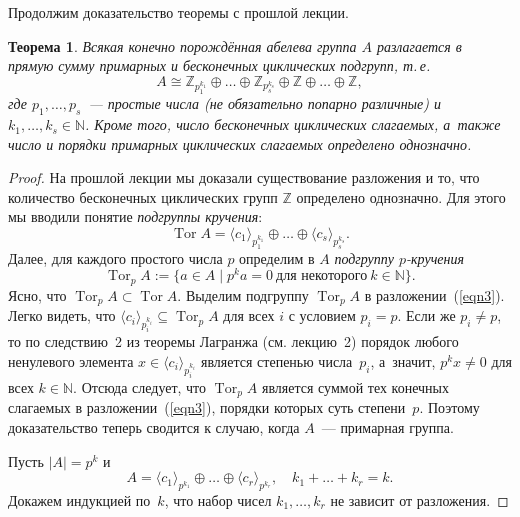 \documentclass[a4paper,10pt]{amsart}
\DeclareMathOperator{\Tor}{\mathrm{Tor}}
\def\ZZ{{\mathbb Z}}%
\def\NN{{\mathbb N}}%
\newtheorem{theorem}{Теорема}
\theoremstyle{definition}
\theoremstyle{remark}
\begin{document}
Продолжим доказательство теоремы с прошлой лекции.

\begin{theorem} \label{traz}
Всякая конечно порождённая абелева группа $A$ разлагается в прямую
сумму примарных и бесконечных циклических подгрупп, т.\,е.
\begin{equation} \label{eqn}
A \cong \ZZ_{p_1^{k_1}} \oplus \ldots \oplus \ZZ_{p_s^{k_s}} \oplus
\ZZ \oplus \ldots \oplus \ZZ,
\end{equation}
где $p_1, \ldots, p_s$~--- простые числа \textup(не обязательно
попарно различные\textup) и $k_1, \ldots, k_s \in \NN$. Кроме того,
число бесконечных циклических слагаемых, а~также число и порядки
примарных циклических слагаемых определено однозначно.
\end{theorem}

\begin{proof}
На прошлой лекции мы доказали существование разложения и то, что количество
бесконечных циклических групп $\ZZ$ определено однозначно. Для этого мы вводили
понятие \textit{подгруппы кручения}:
\begin{equation} \label{eqn3}
\Tor A = \langle c_1 \rangle_{p_1^{k_1}} \oplus \ldots \oplus
\langle c_s \rangle_{p_s^{k_s}}.
\end{equation}
Далее, для каждого простого числа $p$ определим в $A$ {\it подгруппу
$p$-кручения}
\begin{equation} \label{eqn4}
\Tor_p A := \{ a\in A \mid p^ka=0 \ \text{для некоторого} \ k \in
\NN \}.
\end{equation}
Ясно, что $\Tor_p A \subset \Tor A$. Выделим подгруппу $\Tor_p A$ в
разложении~(\ref{eqn3}). Легко видеть, что $\langle c_i
\rangle_{p_i^{k_i}} \subseteq \Tor_p A$ для всех $i$ с условием $p_i
= p$. Если же $p_i \ne p$, то по следствию~2 из теоремы Лагранжа
(см. лекцию~2) порядок любого ненулевого элемента $x \in \langle c_i
\rangle_{p_i^{k_i}}$ является степенью числа~$p_i$, а~значит, $p^k x
\ne 0$ для всех $k \in \NN$. Отсюда следует, что $\Tor_p A$ является
суммой тех конечных слагаемых в разложении~(\ref{eqn3}), порядки
которых суть степени~$p$. Поэтому доказательство теперь сводится к
случаю, когда $A$~--- примарная группа.

Пусть $|A|=p^k$ и
$$
A = \langle c_1\rangle_{p^{k_1}}\oplus\ldots\oplus\langle
c_r\rangle_{p^{k_r}}, \quad k_1+\ldots+k_r=k.
$$
Докажем индукцией по~$k$, что набор чисел $k_1, \ldots, k_r$ не
зависит от разложения.


\end{proof}
\end{document}
